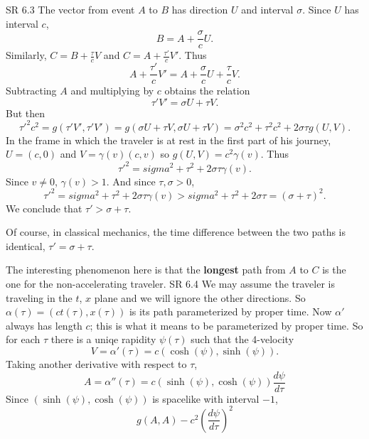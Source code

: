 \documentclass[minion]{homework}
\begin{document}
\begin{aproblems}

\hproblem SR 6.3
\solution
The vector from event $A$ to $B$ has direction $U$ and
interval $\sigma$.  Since $U$ has interval $c$,
$$
B = A + \frac{\sigma}{c} U.
$$
Similarly, $C = B + \frac{\tau}{c}V$ and $C = A + \frac{\tau'}{c} V'$.
Thus
\[
A + \frac{\tau'}{c} V' = A + \frac{\sigma}{c} U + \frac{\tau}{c}V.
\]
Subtracting $A$ and multiplying by $c$ obtains the relation
\[
\tau' V' = \sigma U + \tau V.
\]
But then
\[
\tau'^2c^2 = g(\tau' V',\tau' V') = g(\sigma U + \tau V,\sigma U + \tau V) = \sigma^2 c^2 + \tau^2 c^2 + 2 \sigma \tau g(U,V).
\]
In the frame in which the traveler is at rest in the first part of his journey,
$U=(c,0)$ and $V = \gamma(v)(c,v)$ so $g(U,V)=c^2\gamma(v)$.  Thus
\[
\tau'^2 = sigma^2 + \tau^2 + 2 \sigma \tau \gamma(v).
\]
Since $v\neq 0$, $\gamma(v)>1$.  And since $\tau,\sigma>0$,
\[
\tau'^2 = sigma^2 + \tau^2 + 2 \sigma \tau \gamma(v) > sigma^2 + \tau^2 + 2 \sigma \tau = (\sigma+\tau)^2.
\]
We conclude that $\tau' > \sigma+\tau$.

Of course, in classical mechanics, the time difference between the two paths is identical, $\tau' = \sigma + \tau$.  

The interesting phenomenon here is that the \textbf{longest} path from $A$ to $C$
is the one for the non-accelerating traveler.
\hproblem SR 6.4
\solution
We may assume the traveler is traveling in the $t$, $x$ plane and we will ignore the other directions.  So $\alpha(\tau) = (ct(\tau),x(\tau))$ is its path
parameterized by proper time.  Now $\alpha'$ always has length $c$; this is
what it means to be parameterized by proper time.  So for each $\tau$ there
is a uniqe rapidity $\psi(\tau)$ such that the 4-velocity
\[
V = \alpha'(\tau) = c(\cosh(\psi),\sinh(\psi)).
\]
Taking another derivative with respect to $\tau$,
\[
A = \alpha''(\tau) = c(\sinh(\psi),\cosh(\psi))\frac{d\psi}{d\tau}
\]
Since $(\sinh(\psi),\cosh(\psi))$ is spacelike with interval $-1$,
\[
g(A,A) -c^2\left(\frac{d\psi}{d\tau}\right)^2
\]


\end{aproblems}
\end{document}

